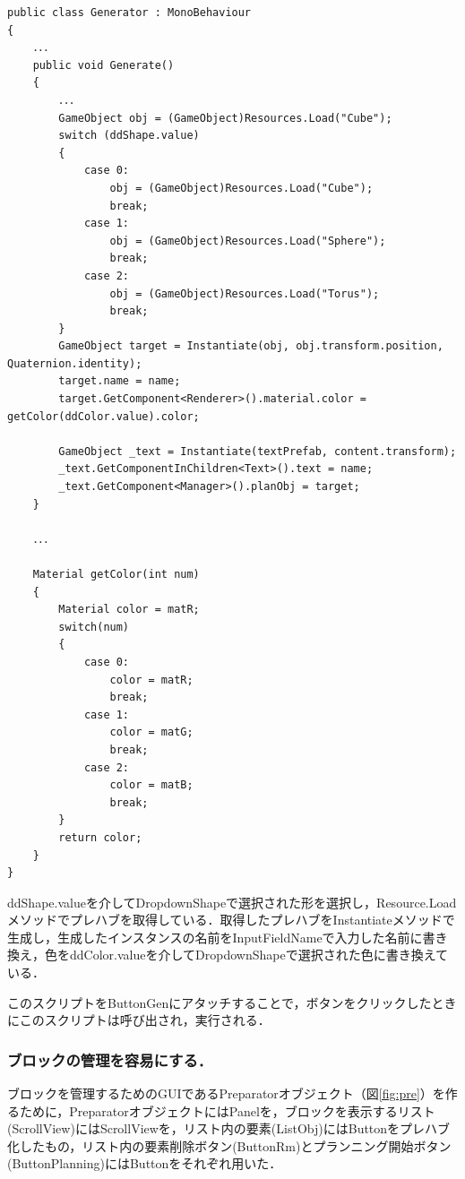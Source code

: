 \documentclass[12pt]{jarticle}
\begin{document}
\begin{lstlisting}[caption=Generatorクラス, label=src:gen]
public class Generator : MonoBehaviour
{
    ．．．
    public void Generate()
    {
        ．．．
        GameObject obj = (GameObject)Resources.Load("Cube");
        switch (ddShape.value)
        {
            case 0:
                obj = (GameObject)Resources.Load("Cube");
                break;
            case 1:
                obj = (GameObject)Resources.Load("Sphere");
                break;
            case 2:
                obj = (GameObject)Resources.Load("Torus");
                break;
        }
        GameObject target = Instantiate(obj, obj.transform.position, Quaternion.identity);
        target.name = name;
        target.GetComponent<Renderer>().material.color = getColor(ddColor.value).color;

        GameObject _text = Instantiate(textPrefab, content.transform);
        _text.GetComponentInChildren<Text>().text = name;
        _text.GetComponent<Manager>().planObj = target;
    }
    
    ．．．

    Material getColor(int num)
    {
        Material color = matR;
        switch(num)
        {
            case 0:
                color = matR;
                break;
            case 1:
                color = matG;
                break;
            case 2:
                color = matB;
                break;
        }
        return color;
    }
}
\end{lstlisting}

ddShape.valueを介してDropdownShapeで選択された形を選択し，Resource.Loadメソッドでプレハブを取得している．取得したプレハブをInstantiateメソッドで生成し，生成したインスタンスの名前をInputFieldNameで入力した名前に書き換え，色をddColor.valueを介してDropdownShapeで選択された色に書き換えている．

このスクリプトをButtonGenにアタッチすることで，ボタンをクリックしたときにこのスクリプトは呼び出され，実行される．
\clearpage

\subsubsection{ブロックの管理を容易にする．}
ブロックを管理するためのGUIであるPreparatorオブジェクト（図\ref{fig:pre}）を作るために，PreparatorオブジェクトにはPanelを，ブロックを表示するリスト(ScrollView)にはScrollViewを，リスト内の要素(ListObj)にはButtonをプレハブ化したもの，リスト内の要素削除ボタン(ButtonRm)とプランニング開始ボタン(ButtonPlanning)にはButtonをそれぞれ用いた．
\end{document}
